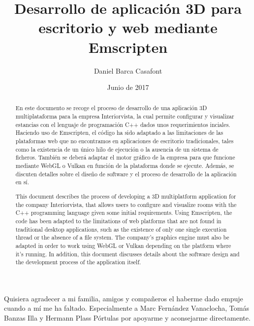 \documentclass{report}
\title{Desarrollo de aplicación 3D para escritorio y web mediante Emscripten}
\author{Daniel Barca Casafont}
\date{Junio de 2017}
\begin{document}
\begin{titlepage}
\maketitle
\end{titlepage}

\cleardoublepage
\renewcommand{\contentsname}{Índice}
\tableofcontents

\cleardoublepage
\begin{abstract}
En este documento se recoge el proceso de desarrollo de una aplicación 3D multiplataforma para la empresa Interiorvista, la cual permite configurar y visualizar estancias con el lenguaje de programación C++ dados unos requerimientos inciales. Haciendo uso de Emscripten, el código ha sido adaptado a las limitaciones de las plataformas web que no encontramos en aplicaciones de escritorio tradicionales, tales como la existencia de un único hilo de ejecución o la ausencia de un sistema de ficheros. También se deberá adaptar el motor gráfico de la empresa para que funcione mediante WebGL o Vulkan en función de la plataforma donde se ejecute. Además, se discuten detalles sobre el diseño de software y el proceso de desarrollo de la aplicación en sí.

This document describes the process of developing a 3D multiplatform application for the company Interiorvista, that allows users to configure and visualize rooms with the C++ programming language given some initial requirements. Using Emscripten, the code has been adapted to the limitations of web platforms that are not found in traditional desktop applications, such as the existence of only one single execution thread or the absence of a file system. The company's graphics engine must also be adapted in order to work using WebGL or Vulkan depending on the platform where it's running. In addition, this document discusses details about the software design and the development process of the application itself.
\end{abstract}

\cleardoublepage
\renewcommand{\listfigurename}{Lista de Figuras}
\listoffigures

\cleardoublepage

Quisiera agradecer a mi familia, amigos y compañeros el haberme dado empuje cuando a mí me ha faltado. Especialmente a Marc Fernández Vanaclocha, Tomás Banzas Illa y Hermann Plass Pórtulas por apoyarme y aconsejarme directamente.

\cleardoublepage
{}
\end{document}
